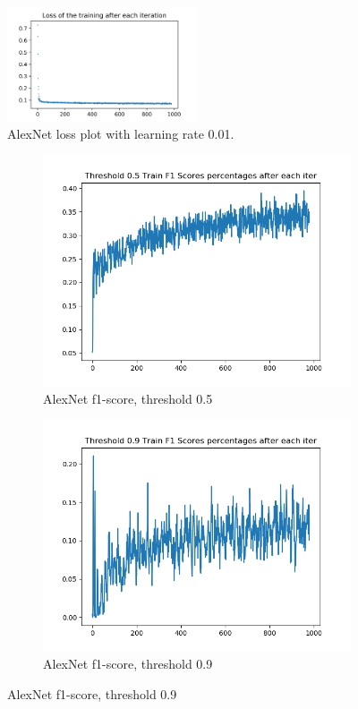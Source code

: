 \documentclass[12pt]{article}
\begin{document}
\begin{figure}[!ht]
\centering
\includegraphics[width=0.5\textwidth]{alexnet-lazy-1_0-train-loss.png}
\caption{\label{alexnet:alexnet-lazy-1_0-loss}AlexNet loss plot with learning rate 0.01.}
\end{figure}

\begin{figure}[!ht]
\centering
\begin{subfigure}{.5\textwidth}
	\centering
	\includegraphics[width=1\linewidth]{alexnet-lazy-1_0-train-scores-f1-5.png}
	\caption{\label{alexnet:alexnet-lazy-1_0-train-scores-f1-5}AlexNet f1-score, threshold 0.5}
\end{subfigure}%
\begin{subfigure}{.5\textwidth}
	\centering
	\includegraphics[width=1\linewidth]{alexnet-lazy-1_0-train-scores-f1-9.png}
	\caption{ \label{alexnet:alexnet-lazy-1_0-train-scores-f1-9}AlexNet f1-score, threshold 0.9}
\end{subfigure}
\end{figure}
\end{document}
